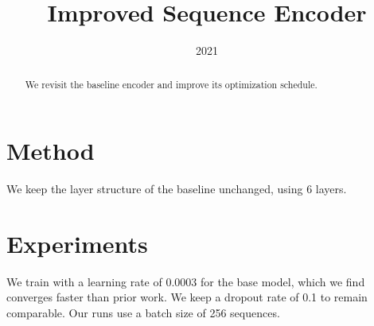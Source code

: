 \documentclass{article}
\title{Improved Sequence Encoder}
\date{2021}
\begin{document}
\begin{abstract}
We revisit the baseline encoder and improve its optimization schedule.
\end{abstract}

\section{Method}
We keep the layer structure of the baseline unchanged, using 6 layers.

\section{Experiments}
We train with a learning rate of 0.0003 for the base model, which we find
converges faster than prior work. We keep a dropout rate of 0.1 to remain
comparable. Our runs use a batch size of 256 sequences.
\end{document}
